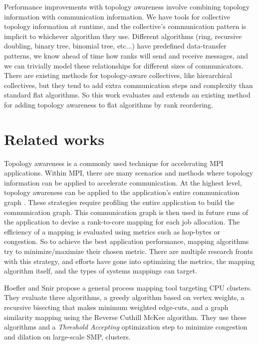 Performance improvements with topology awareness involve combining topology information with communication information.
We have tools for collective topology information at runtime, and the collective's communication pattern is implicit to whichever algorithm they use.  
Different algorithms (ring, recursive doubling, binary tree, binomial tree, etc...) have predefined data-transfer patterns, we know ahead of time how ranks will send and receive messages, and we can trivially model these relationships for different sizes of communicators.
There are existing methods for topology-aware collectives, like hierarchical collectives, but they tend to add extra communication steps and complexity than standard flat algorithms.
So this work evaluates and extends an existing method for adding topology awareness to flat algorithms by rank reordering.

\section{Related works}
Topology awareness is a commonly used technique for accelerating \gls{MPI} applications. 
Within \gls{MPI}, there are many scenarios and methods where topology information can be applied to accelerate communication.
At the highest level, topology awareness can be applied to the application's entire communication graph \cite{Hoefler2011GenericTopoMappingStrats, Mirsadeghi2016PTRAM, Faraji2016TopoAwareGPUSelection, Mirsadeghi2016MAGC, Galvez2017AutoTopoMap}.
These strategies require profiling the entire application to build the communication graph.
This communication graph is then used in future runs of the application to devise a rank-to-core mapping for each job allocation.
The efficiency of a mapping is evaluated using metrics such as hop-bytes or congestion.
So to achieve the best application performance, mapping algorithms try to minimize/maximize their chosen metric.
There are multiple research fronts with this strategy, and efforts have gone into optimizing the metrics, the mapping algorithm itself, and the types of systems mappings can target.

Hoefler and Snir \cite{Hoefler2011GenericTopoMappingStrats} propose a general process mapping tool targeting \gls{CPU} clusters.
They evaluate three algorithms, a greedy algorithm based on vertex weights, a recursive bisecting that makes minimum weighted edge-cuts, and a graph similarity mapping using the Reverse Cuthill McKee algorithm. 
They use these algorithms and a \textit{Threshold Accepting} optimization step to minimize congestion and dilation on large-scale \gls{SMP}, clusters.

